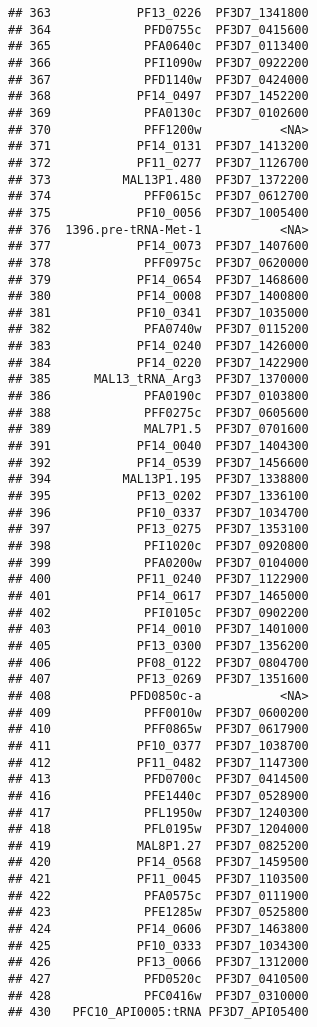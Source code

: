 \documentclass{article}\usepackage[]{graphicx}\usepackage[]{color}
\makeatletter
\newenvironment{kframe}{%
 \def\at@end@of@kframe{}%
 \ifinner\ifhmode%
  \def\at@end@of@kframe{\end{minipage}}%
  \begin{minipage}{\columnwidth}%
 \fi\fi%
 \def\FrameCommand##1{\hskip\@totalleftmargin \hskip-\fboxsep
 \colorbox{shadecolor}{##1}\hskip-\fboxsep
     \hskip-\linewidth \hskip-\@totalleftmargin \hskip\columnwidth}%
 \MakeFramed {\advance\hsize-\width
   \@totalleftmargin\z@ \linewidth\hsize
   \@setminipage}}%
 {\par\unskip\endMakeFramed%
 \at@end@of@kframe}
\newenvironment{knitrout}{}{} %
\makeatother
\begin{document}
\begin{knitrout}
\begin{kframe}
\begin{verbatim}
## 363            PF13_0226  PF3D7_1341800
## 364             PFD0755c  PF3D7_0415600
## 365             PFA0640c  PF3D7_0113400
## 366             PFI1090w  PF3D7_0922200
## 367             PFD1140w  PF3D7_0424000
## 368            PF14_0497  PF3D7_1452200
## 369             PFA0130c  PF3D7_0102600
## 370             PFF1200w           <NA>
## 371            PF14_0131  PF3D7_1413200
## 372            PF11_0277  PF3D7_1126700
## 373          MAL13P1.480  PF3D7_1372200
## 374             PFF0615c  PF3D7_0612700
## 375            PF10_0056  PF3D7_1005400
## 376  1396.pre-tRNA-Met-1           <NA>
## 377            PF14_0073  PF3D7_1407600
## 378             PFF0975c  PF3D7_0620000
## 379            PF14_0654  PF3D7_1468600
## 380            PF14_0008  PF3D7_1400800
## 381            PF10_0341  PF3D7_1035000
## 382             PFA0740w  PF3D7_0115200
## 383            PF14_0240  PF3D7_1426000
## 384            PF14_0220  PF3D7_1422900
## 385      MAL13_tRNA_Arg3  PF3D7_1370000
## 386             PFA0190c  PF3D7_0103800
## 388             PFF0275c  PF3D7_0605600
## 389             MAL7P1.5  PF3D7_0701600
## 391            PF14_0040  PF3D7_1404300
## 392            PF14_0539  PF3D7_1456600
## 394          MAL13P1.195  PF3D7_1338800
## 395            PF13_0202  PF3D7_1336100
## 396            PF10_0337  PF3D7_1034700
## 397            PF13_0275  PF3D7_1353100
## 398             PFI1020c  PF3D7_0920800
## 399             PFA0200w  PF3D7_0104000
## 400            PF11_0240  PF3D7_1122900
## 401            PF14_0617  PF3D7_1465000
## 402             PFI0105c  PF3D7_0902200
## 403            PF14_0010  PF3D7_1401000
## 405            PF13_0300  PF3D7_1356200
## 406            PF08_0122  PF3D7_0804700
## 407            PF13_0269  PF3D7_1351600
## 408           PFD0850c-a           <NA>
## 409             PFF0010w  PF3D7_0600200
## 410             PFF0865w  PF3D7_0617900
## 411            PF10_0377  PF3D7_1038700
## 412            PF11_0482  PF3D7_1147300
## 413             PFD0700c  PF3D7_0414500
## 416             PFE1440c  PF3D7_0528900
## 417             PFL1950w  PF3D7_1240300
## 418             PFL0195w  PF3D7_1204000
## 419            MAL8P1.27  PF3D7_0825200
## 420            PF14_0568  PF3D7_1459500
## 421            PF11_0045  PF3D7_1103500
## 422             PFA0575c  PF3D7_0111900
## 423             PFE1285w  PF3D7_0525800
## 424            PF14_0606  PF3D7_1463800
## 425            PF10_0333  PF3D7_1034300
## 426            PF13_0066  PF3D7_1312000
## 427             PFD0520c  PF3D7_0410500
## 428             PFC0416w  PF3D7_0310000
## 430   PFC10_API0005:tRNA PF3D7_API05400

\end{verbatim}
\end{kframe}
\end{knitrout}
\end{document}
